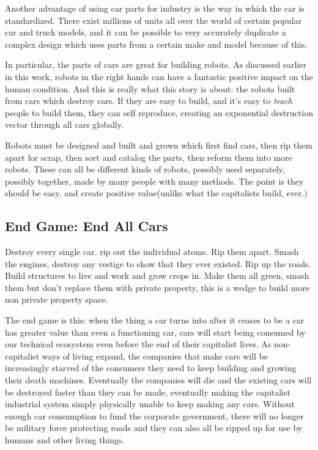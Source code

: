 Another advantage of using car parts for industry is the way in which
the car is standardized. There exist millions of units all over the
world of certain popular car and truck models, and it can be possible to
very accurately duplicate a complex design which uses parts from a
certain make and model because of this.

In particular, the parts of cars are great for building robots. As
discussed earlier in this work, robots in the right hands can have a
fantastic positive impact on the human condition. And this is really
what this story is about: the robots built from cars which destroy cars.
If they are easy to build, and it's easy to \emph{teach} people to build
them, they can self reproduce, creating an exponential destruction
vector through all cars globally.

Robots must be designed and built and grown which first find cars, then
rip them apart for scrap, then sort and catalog the parts, then reform
them into more robots. These can all be different kinds of robots,
possibly used separately, possibly together, made by many people with
many methods. The point is they should be easy, and create positive
value(unlike what the capitalists build, ever.)

\subsection{End Game: End All Cars}\label{end-game-end-all-cars}

Destroy every single car. rip out the individual atoms. Rip them apart.
Smash the engines, destroy any vestige to show that they ever existed.
Rip up the roads. Build structures to live and work and grow crops in.
Make them all green, smash them but don't replace them with private
property, this is a wedge to build more non private property space.

The end game is this: when the thing a car turns into after it ceases to
be a car has greater value than even a functioning car, cars will start
being consumed by our technical ecosystem even before the end of their
capitalist lives. As non-capitalist ways of living expand, the companies
that make cars will be increasingly starved of the consumers they need
to keep building and growing their death machines. Eventually the
companies will die and the existing cars will be destroyed faster than
they can be made, eventually making the capitalist industrial system
simply physically unable to keep making any cars. Without enough car
consumption to fund the corporate government, there will no longer be
military force protecting roads and they can also all be ripped up for
use by humans and other living things.

